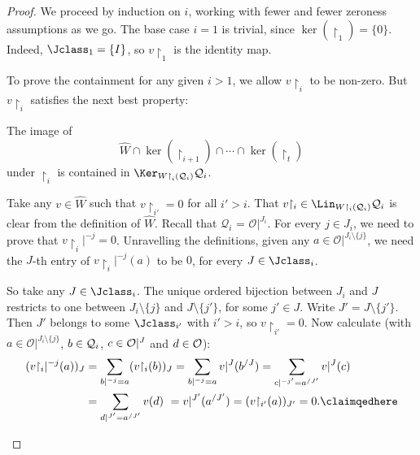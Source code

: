 \begin{proof}
We proceed by induction on $i$, working with fewer and fewer zeroness assumptions as we go.
The base case $i = 1$ is trivial, since $\ker(\restriction_1) = \{0\}$. 
Indeed, $\Jclass_1=\{I\}$, so $v{\restriction_1}$ is the identity map.

To prove the containment for any given $i>1$, 
we allow $v {\restriction_i}$ to be non-zero.
But $v {\restriction_i}$ satisfies the next best property:
\begin{claim}
    The image of \[
        \widehat W \cap \ker(\restriction_{i+1}) \cap \cdots \cap \ker(\restriction_t)
    \] 
    under $\restriction_{i}$ is contained in $\Ker_{W {\restriction}_{i} (\mathcal{Q}_{i})} \mathcal{Q}_{i}$. 
\end{claim}
\begin{claimproof}
    Take any $v \in \widehat W$ such that  $v {\restriction_{i'}} = 0$ for all $i'>i$.
    That $v {\restriction_{i}} \in \Lin_{W{\restriction_{i}}(\mathcal{Q}_{i})} \mathcal{Q}_{i}$ is clear from the definition of $\widehat W$.
    Recall that $\mathcal{Q}_{i}$ = $\mathcal{O}|^{J_{i}}$.
    For every $j \in J_{i}$,
    we need to prove that $v {\restriction_{i}} |^{-j} = 0$. 
    Unravelling the definitions, given any $a\in\mathcal{O}|^{J_{i}\setminus\{j\}}$, we need the $J$-th entry of $v {\restriction_{i}} |^{-j}(a)$ to be $0$, for every $J\in \Jclass_i$.
    
    So take any $J \in \Jclass_{i}$.
    The unique ordered bijection between $J_{i}$ and $J$ restricts to one between $J_{i} \setminus \{j\}$ and $J \setminus \{j'\}$, for some $j'\in J$. 
    Write $J'=J \setminus \{j'\}$.
    Then $J'$ belongs to some $\Jclass_{i'}$ with $i' > i $,
    so $v {\restriction_{i'}} = 0$. Now calculate (with $a\in\mathcal{O}|^{J_{i}\setminus\{j\}}$, $b\in{\cal Q}_i$, $c\in {\cal O}|^J$ and $d\in\cal O$):
\begin{align*}
	(v{\restriction_i}|^{-j}(a))_J &= \sum_{b|^{-j}=a}(v{\restriction_i}(b))_J
	= \sum_{b|^{-j}=a}v|^J(b^{/J}) 
	= \sum_{c|^{-j'}=a^{/J'}}v|^J(c) \\
	&= \sum_{d|^{J'}=a^{/J'}}v(d)
	\,\, = v|^{J'}(a^{/J'}) = (v{\restriction_{i'}}(a))_{J'} = 0.
    \claimqedhere
\end{align*}    
\end{claimproof}


\end{proof}
